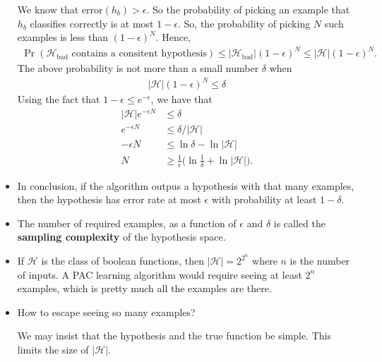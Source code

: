 \documentclass[10pt]{article}
\begin{document}
\begin{itemize}
        We know that $\mathrm{error}(h_b) > \epsilon.$
        So the probability of picking an example that $h_b$
        classifies correctly is at most $1-\epsilon$.
        So, the probability of picking $N$ such examples
        is less than $(1 - \epsilon)^N$. Hence,
        \begin{align*}
            \Pr(\mbox{$\mathcal{H}_{\mathrm{bad}}$ contains
            a consitent hypothesis}) \leq 
            |\mathcal{H}_{\mathrm{bad}}|(1-\epsilon)^N
            \leq |\mathcal{H}|(1 - \epsilon)^N.
        \end{align*}
        The above probability is not more than a small number
        $\delta$ when
        \begin{align*}
            | \mathcal{H} | (1 - \epsilon)^N \leq \delta
        \end{align*}
        Using the fact that $1-\epsilon \leq e^{-\epsilon}$,
        we have that
        \begin{align*}
            | \mathcal{H} | e^{-\epsilon N} &\leq \delta\\
            e^{-\epsilon N} &\leq \delta / | \mathcal{H} |\\
            -\epsilon N &\leq  \ln \delta - \ln | \mathcal{H} |\\
            N &\geq \frac{1}{\epsilon} \bigg( \ln \frac{1}{\delta} + \ln | \mathcal{H} | \bigg).
        \end{align*}
    
    \item In conclusion, if the algorithm outpus a hypothesis
        with that many examples, then the hypothesis has error
        rate at most $\epsilon$ with probability at least 
        $1-\delta$.
        
    \item The number of required examples, as a function of
        $\epsilon$ and $\delta$ is called the {\bf sampling
        complexity} of the hypothesis space.
        
    \item If $\mathcal{H}$ is the class of boolean functions,
        then $|\mathcal{H}| = 2^{2^n}$ where $n$ is the number
        of inputs. A PAC learning algorithm would require seeing
        at least $2^n$ examples, which is pretty much all
        the examples are there.
        
    \item How to escape seeing so many examples? 
    
        We may insist that the hypothesis and the 
        true function be simple. 
        This limits the size of $|\mathcal{H}|$.
\end{itemize}
\end{document}

